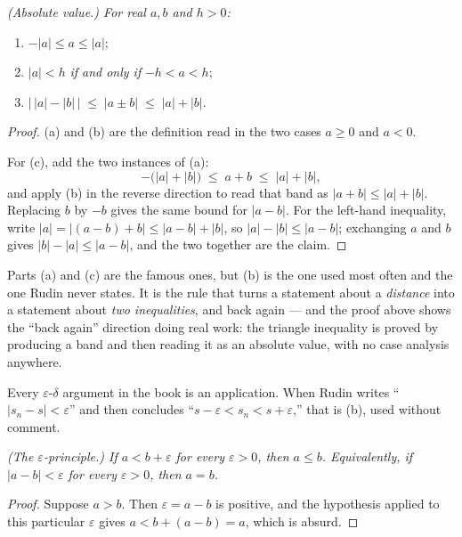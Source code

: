 \emph{(Absolute value.) For real $a,b$ and $h>0$:}
\begin{enumerate}[label=(\alph*), leftmargin=2.2em, itemsep=2pt, topsep=3pt]
  \item $-|a| \le a \le |a|$;
  \item $|a| < h$ \emph{if and only if} $-h < a < h$;
  \item $\bigl|\,|a|-|b|\,\bigr| \;\le\; |a \pm b| \;\le\; |a|+|b|$.
\end{enumerate}

\begin{proof}
(a) and (b) are the definition read in the two cases $a \ge 0$ and $a<0$.

For (c), add the two instances of (a):
\[ -\bigl(|a|+|b|\bigr) \;\le\; a+b \;\le\; |a|+|b| , \]
and apply (b) in the reverse direction to read that band as
$|a+b| \le |a|+|b|$. Replacing $b$ by $-b$ gives the same bound for
$|a-b|$. For the left-hand inequality, write $|a| = |(a-b)+b| \le |a-b|+|b|$,
so $|a|-|b| \le |a-b|$; exchanging $a$ and $b$ gives
$|b|-|a| \le |a-b|$, and the two together are the claim.
\end{proof}

\begin{unpack}
Parts (a) and (c) are the famous ones, but (b) is the one used most often and
the one Rudin never states. It is the rule that turns a statement about a
\emph{distance} into a statement about \emph{two inequalities}, and back
again --- and the proof above shows the ``back again'' direction doing real
work: the triangle inequality is proved by producing a band and then reading
it as an absolute value, with no case analysis anywhere.

Every $\varepsilon$-$\delta$ argument in the book is an application. When
Rudin writes ``$|s_n - s| < \varepsilon$'' and then concludes
``$s - \varepsilon < s_n < s + \varepsilon$,'' that is (b), used without
comment.
\end{unpack}

\emph{(The $\varepsilon$-principle.) If $a < b + \varepsilon$ for every
$\varepsilon > 0$, then $a \le b$. Equivalently, if
$|a - b| < \varepsilon$ for every $\varepsilon>0$, then $a = b$.}

\begin{proof}
Suppose $a > b$. Then $\varepsilon = a - b$ is positive, and the hypothesis
applied to this particular $\varepsilon$ gives $a < b + (a-b) = a$, which is
absurd.
\end{proof}


